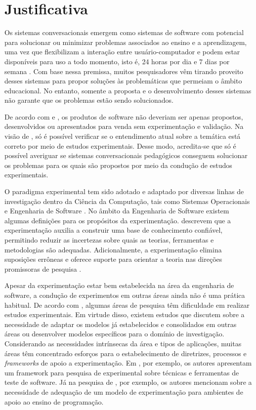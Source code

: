 \section{Justificativa}

Os sistemas conversacionais emergem como sistemas de software com potencial para solucionar ou minimizar problemas associados ao ensino e a aprendizagem, uma vez que flexibilizam a interação entre usuário-computador e podem estar disponíveis para uso a todo momento, isto é, 24 horas por dia e 7 dias por semana \cite{Jain:2018}. Com base nessa premissa, muitos pesquisadores vêm tirando proveito desses sistemas para propor soluções às problemáticas que permeiam o âmbito educacional. No entanto, somente a proposta e o desenvolvimento desses sistemas não garante que os problemas estão sendo solucionados. 

De acordo com  e  , os produtos de software não deveriam ser apenas propostos, desenvolvidos ou apresentados para venda sem experimentação e validação. Na visão de , só é possível verificar se o entendimento atual sobre a temática está correto por meio de estudos experimentais. Desse modo, acredita-se que só é possível averiguar se sistemas conversacionais pedagógicos conseguem solucionar os problemas para os quais são propostos por meio da condução de estudos experimentais.

O paradigma experimental tem sido adotado e adaptado por diversas linhas de investigação dentro da Ciência da Computação, tais como Sistemas Operacionais \cite{FORTIER2003331} e Engenharia de Software \cite{Wohlin}. No âmbito da Engenharia de Software existem algumas definições para os propósitos da experimentação.  descrevem que a experimentação auxilia a construir uma base de conhecimento confiável, permitindo reduzir as incertezas sobre quais as teorias, ferramentas e metodologias são adequadas. Adicionalmente, a experimentação elimina suposições errôneas e oferece suporte para orientar a teoria nas direções promissoras de pesquisa \cite{Conradi:2001}.

Apesar da experimentação estar bem estabelecida na área da engenharia de software, a condução de experimentos em outras áreas ainda não é uma prática habitual. De acordo com , algumas áreas de pesquisa têm dificuldade em realizar estudos experimentais. Em virtude disso, existem estudos que discutem sobre a necessidade de adaptar os modelos já estabelecidos e consolidados em outras áreas ou desenvolver modelos específicos para o domínio de investigação. Considerando as necessidades intrínsecas da área e tipos de aplicações, muitas áreas têm concentrado esforços para o estabelecimento de diretrizes, processos e \textit{frameworks} de apoio a experimentação. Em , por exemplo, os autores apresentam um framework para pesquisa de experimental sobre técnicas e ferramentas de teste de software. Já na pesquisa de , por exemplo, os autores mencionam sobre a necessidade de adequação de um modelo de experimentação para ambientes de apoio ao ensino de programação. 

